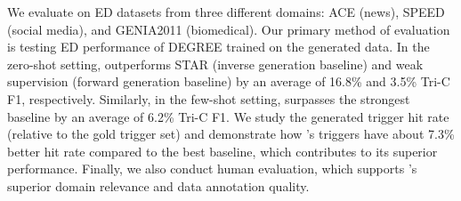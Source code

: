 We evaluate \modelName{} on ED datasets from three different domains: ACE \cite{doddington-etal-2004-automatic} (news), SPEED \cite{parekh-etal-2024-event} (social media), and GENIA2011 \cite{kim-etal-2011-overview-genia} (biomedical).
Our primary method of evaluation is testing ED performance of DEGREE \cite{hsu-etal-2022-degree} trained on the generated data.
In the zero-shot setting, \modelName{} outperforms STAR \cite{star} (inverse generation baseline) and weak supervision (forward generation baseline) by an average of 16.8\% and 3.5\% Tri-C F1, respectively.
Similarly, in the few-shot setting, \modelName{} surpasses the strongest baseline by an average of 6.2\% Tri-C F1.
We study the generated trigger hit rate (relative to the gold trigger set) and demonstrate how \modelName's triggers have about 7.3\% better hit rate compared to the best baseline, which contributes to its superior performance.
Finally, we also conduct human evaluation, which supports \modelName's superior domain relevance and data annotation quality.


